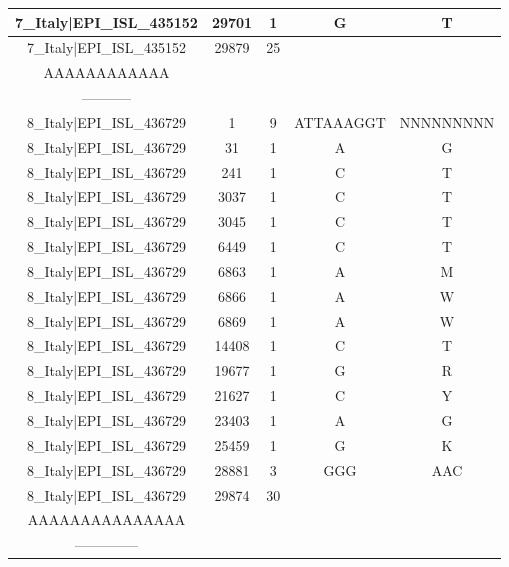 \documentclass[a4paper,10pt]{article}
\begin{document}
\begin{longtable}{@{}ccccc@{}}
7\_Italy|EPI\_ISL\_435152 & 29701 & 1 & G & T \\* \midrule
7\_Italy|EPI\_ISL\_435152 & 29879 & 25 & \begin{tabular}[c]{@{}c@{}}AAAAAAAAAAAAA\\ AAAAAAAAAAAA\end{tabular} & \begin{tabular}[c]{@{}c@{}}--------------\\ -----------\end{tabular} \\* \midrule
8\_Italy|EPI\_ISL\_436729 & 1 & 9 & ATTAAAGGT & NNNNNNNNN \\* \midrule
8\_Italy|EPI\_ISL\_436729 & 31 & 1 & A & G \\* \midrule
8\_Italy|EPI\_ISL\_436729 & 241 & 1 & C & T \\* \midrule
8\_Italy|EPI\_ISL\_436729 & 3037 & 1 & C & T \\* \midrule
8\_Italy|EPI\_ISL\_436729 & 3045 & 1 & C & T \\* \midrule
8\_Italy|EPI\_ISL\_436729 & 6449 & 1 & C & T \\* \midrule
8\_Italy|EPI\_ISL\_436729 & 6863 & 1 & A & M \\* \midrule
8\_Italy|EPI\_ISL\_436729 & 6866 & 1 & A & W \\* \midrule
8\_Italy|EPI\_ISL\_436729 & 6869 & 1 & A & W \\* \midrule
8\_Italy|EPI\_ISL\_436729 & 14408 & 1 & C & T \\* \midrule
8\_Italy|EPI\_ISL\_436729 & 19677 & 1 & G & R \\* \midrule
8\_Italy|EPI\_ISL\_436729 & 21627 & 1 & C & Y \\* \midrule
8\_Italy|EPI\_ISL\_436729 & 23403 & 1 & A & G \\* \midrule
8\_Italy|EPI\_ISL\_436729 & 25459 & 1 & G & K \\* \midrule
8\_Italy|EPI\_ISL\_436729 & 28881 & 3 & GGG & AAC \\* \midrule
8\_Italy|EPI\_ISL\_436729 & 29874 & 30 & \begin{tabular}[c]{@{}c@{}}AAAAAAAAAAAAAAA\\ AAAAAAAAAAAAAAA\end{tabular} & \begin{tabular}[c]{@{}c@{}}----------------\\ --------------\end{tabular} \\* \bottomrule
\end{longtable}
\end{document}
